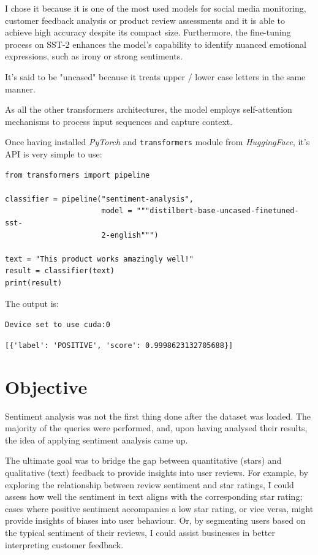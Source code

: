 \documentclass{Configuration_Files/PoliMi3i_thesis}
\begin{document}
I chose it because it is one of the most used models for social media monitoring, customer feedback analysis or product review assessments and it is able to achieve high accuracy despite its compact size.
Furthermore, the fine-tuning process on SST-2 enhances the model's capability to identify nuanced emotional expressions, such as irony or strong sentiments. 

It's said to be "uncased" because it treats upper / lower case letters in the same manner.

As all the other transformers architectures, the model employs self-attention mechanisms to process input sequences and capture context.

Once having installed \textit{PyTorch} and \texttt{transformers} module from \textit{HuggingFace}, it's API is very simple to use:

\bigskip

\begin{verbatim}
from transformers import pipeline

classifier = pipeline("sentiment-analysis", 
                      model = """distilbert-base-uncased-finetuned-sst-
                      2-english""")

text = "This product works amazingly well!"
result = classifier(text)
print(result)
\end{verbatim}

\bigskip

The output is: 

\texttt{Device set to use cuda:0}

\verb|[{'label': 'POSITIVE', 'score': 0.9998623132705688}]|

\section{Objective}
Sentiment analysis was not the first thing done after the dataset was loaded. The majority of the queries were performed, and, upon having analysed their results, the idea of applying sentiment analysis came up. 

The ultimate goal was to bridge the gap between quantitative (stars) and qualitative (text) feedback to provide insights into user reviews. For example, by exploring the relationship between review sentiment and star ratings, I could assess how well the sentiment in text aligns with the corresponding star rating; cases where positive sentiment accompanies a low star rating, or vice versa, might provide insights of biases into user behaviour. Or, by segmenting users based on the typical sentiment of their reviews, I could assist businesses in better interpreting customer feedback. 
\end{document}
